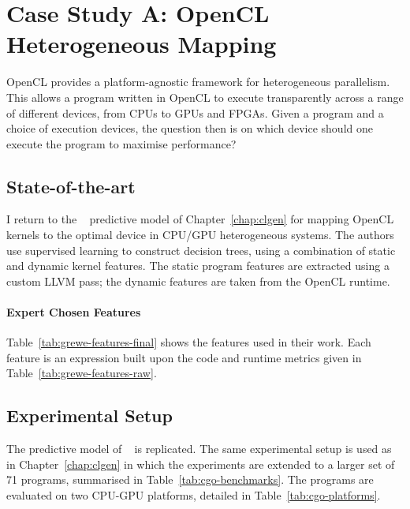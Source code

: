 \section{Case Study A: OpenCL Heterogeneous Mapping}
\label{sec:deeptune-case-study-a}

OpenCL provides a platform-agnostic framework for heterogeneous parallelism. This allows a program written in OpenCL to execute transparently across a range of different devices, from CPUs to GPUs and FPGAs. Given a program and a choice of execution devices, the question then is on which device should one execute the program to maximise performance?

\subsection{State-of-the-art}

I return to the \citeauthor{Grewe2013}~\cite{Grewe2013} predictive model of Chapter~\ref{chap:clgen} for mapping OpenCL kernels to the optimal device in CPU/GPU heterogeneous systems. The authors use supervised learning to construct decision trees, using a combination of static and dynamic kernel features. The static program features are extracted using a custom LLVM pass; the dynamic features are taken from the OpenCL runtime.

\paragraph*{Expert Chosen Features}

Table~\ref{tab:grewe-features-final} shows the features used in their work. Each feature is an expression built upon the code and runtime metrics given in Table~\ref{tab:grewe-features-raw}.



\subsection{Experimental Setup}

The predictive model of \citeauthor{Grewe2013}~\cite{Grewe2013} is replicated. The same experimental setup is used as in Chapter~\ref{chap:clgen} in which the experiments are extended to a larger set of 71 programs, summarised in Table~\ref{tab:cgo-benchmarks}. The programs are evaluated on two CPU-GPU platforms, detailed in Table~\ref{tab:cgo-platforms}.

